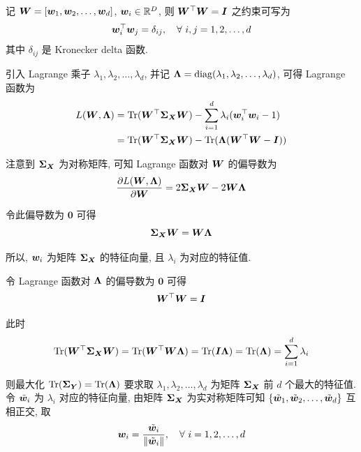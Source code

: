 \documentclass{article}
\begin{document}
记 $\bm{W}=[\bm{w}_1,\bm{w}_2,\dots,\bm{w}_d]$, $\bm{w}_i\in\mathbb{R}^D$, 则 $\bm{W}^\top\bm{W}=\bm{I}$ 之约束可写为
\begin{equation}
  \bm{w}_i^\top\bm{w}_j=\delta_{ij},\quad\forall~i,j=1,2,\dots,d
\end{equation}
其中 $\delta_{ij}$ 是 Kronecker delta 函数. 

引入 Lagrange 乘子 $\lambda_1,\lambda_2,\dots,\lambda_d$, 并记 $\bm{\Lambda}=\operatorname{diag}(\lambda_1,\lambda_2,\dots,\lambda_d)$, 可得 Lagrange 函数为
\begin{equation}
  \begin{aligned}
    L(\bm{W},\bm{\Lambda})
    &=\operatorname{Tr}(\bm{W}^\top\bm{\Sigma}_{\bm{X}}\bm{W})-\sum_{i=1}^d\lambda_i(\bm{w}_i^\top\bm{w}_i-1)\\
    &=\operatorname{Tr}(\bm{W}^\top\bm{\Sigma}_{\bm{X}}\bm{W})-\operatorname{Tr}(\bm{\Lambda}(\bm{W}^\top\bm{W}-\bm{I}))\\
  \end{aligned}
\end{equation}

注意到 $\bm{\Sigma}_{\bm{X}}$ 为对称矩阵, 可知 Lagrange 函数对 $\bm{W}$ 的偏导数为
\begin{equation}
  \frac{\partial L(\bm{W},\bm{\Lambda})}{\partial\bm{W}}
  =2\bm{\Sigma}_{\bm{X}}\bm{W}-2\bm{W}\bm{\Lambda}
\end{equation}

令此偏导数为 $\bm{0}$ 可得
\begin{equation}
  \bm{\Sigma}_{\bm{X}}\bm{W}=\bm{W}\bm{\Lambda}
\end{equation}

所以, $\bm{w}_i$ 为矩阵 $\bm{\Sigma}_{\bm{X}}$ 的特征向量, 且 $\lambda_i$ 为对应的特征值.

令 Lagrange 函数对 $\bm{\Lambda}$ 的偏导数为 $\bm{0}$ 可得
\begin{equation}
  \bm{W}^\top\bm{W}=\bm{I}
\end{equation}

此时
\begin{equation}
  \operatorname{Tr}(\bm{W}^\top\bm{\Sigma}_{\bm{X}}\bm{W})
  =\operatorname{Tr}(\bm{W}^\top\bm{W}\bm{\Lambda})
  =\operatorname{Tr}(\bm{I}\bm{\Lambda})
  =\operatorname{Tr}(\bm{\Lambda})=\sum_{i=1}^d\lambda_i
\end{equation}

则最大化 $\operatorname{Tr}(\bm{\Sigma}_{\bm{Y}})=\operatorname{Tr}(\bm{\Lambda})$ 要求取 $\lambda_1,\lambda_2,\dots,\lambda_d$ 为矩阵 $\bm{\Sigma}_{\bm{X}}$ 前 $d$ 个最大的特征值. 令 $\tilde{\bm{w}}_i$ 为 $\lambda_i$ 对应的特征向量, 由矩阵 $\bm{\Sigma}_{\bm{X}}$ 为实对称矩阵可知 $\{\tilde{\bm{w}}_1,\tilde{\bm{w}}_2,\dots,\tilde{\bm{w}}_d\}$ 互相正交, 取
\begin{equation}
  \bm{w}_i=\frac{\tilde{\bm{w}}_i}{\|\tilde{\bm{w}}_i\|},\quad\forall~i=1,2,\dots,d
\end{equation}
\end{document}
